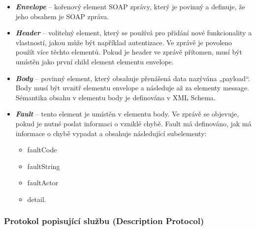 \documentclass[11pt,twoside,a4paper]{book}
\begin{document}
\begin{itemize}
\item \textbf{\textit{Envelope}} – kořenový element SOAP zprávy, který je povinný a definuje, že jeho
obsahem je SOAP zpráva.

\item \textbf{\textit{Header}} – volitelný element, který se používá pro přidání
nové funkcionality a vlastností, jakou může být například autentizace. Ve zprávě je povoleno použít více
těchto elementů. Pokud je header ve zprávě přítomen, musí být umístěn jako první
child element elementu envelope.
 
\item \textbf{\textit{Body}} – povinný element, který obsahuje přenášená
data nazývána „payload“. Body musí být uvnitř elementu envelope a následuje až za elementy message. Sémantika
obsahu v elementu body je definována v XML Schema.

\item \textbf{\textit{Fault}} – tento element je umístěn v elementu body.
Ve zprávě se objevuje, pokud je nutné poslat informaci o vzniklé chybě. Fault má definováno, jak má informace o
chybě vypadat a obsahuje následující subelementy:

\begin{itemize}
  \item faultCode
  \item faultString
  \item faultActor
  \item detail.
\end{itemize}
\end{itemize}

\subsubsection{Protokol popisující službu (Description Protocol)}
\end{document}

